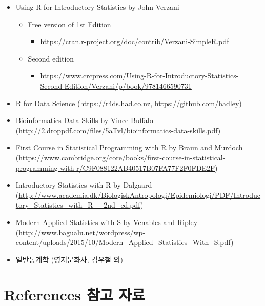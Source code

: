 \documentclass[
]{book}
\providecommand{\tightlist}{%
  \setlength{\itemsep}{0pt}\setlength{\parskip}{0pt}}
\begin{document}
\begin{itemize}
\tightlist
\item
  Using R for Introductory Statistics by John Verzani

  \begin{itemize}
  \tightlist
  \item
    Free version of 1st Edition

    \begin{itemize}
    \tightlist
    \item
      \url{https://cran.r-project.org/doc/contrib/Verzani-SimpleR.pdf}
    \end{itemize}
  \item
    Second edition

    \begin{itemize}
    \tightlist
    \item
      \url{https://www.crcpress.com/Using-R-for-Introductory-Statistics-Second-Edition/Verzani/p/book/9781466590731}
    \end{itemize}
  \end{itemize}
\item
  R for Data Science (\url{https://r4ds.had.co.nz}, \url{https://github.com/hadley})
\item
  Bioinformatics Data Skills by Vince Buffalo (\url{http://2.droppdf.com/files/5aTvl/bioinformatics-data-skills.pdf})
\item
  First Course in Statistical Programming with R by Braun and
  Murdoch (\url{https://www.cambridge.org/core/books/first-course-in-statistical-programming-with-r/C9F088122AB40517B07FA77F2F0FDE2F})
\item
  Introductory Statistics with R by Dalgaard (\url{http://www.academia.dk/BiologiskAntropologi/Epidemiologi/PDF/Introductory_Statistics_with_R__2nd_ed.pdf})
\item
  Modern Applied Statistics with S by Venables and Ripley (\url{http://www.bagualu.net/wordpress/wp-content/uploads/2015/10/Modern_Applied_Statistics_With_S.pdf})
\item
  일반통계학 (영지문화사, 김우철 외)
\end{itemize}

\hypertarget{references-uxcc38uxace0-uxc790uxb8cc}{%
\section{References 참고 자료}\label{references-uxcc38uxace0-uxc790uxb8cc}}
\end{document}
